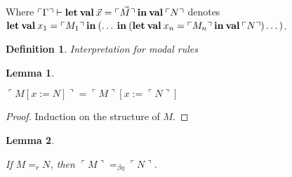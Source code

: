 \documentclass[a4paper]{article}
\newtheorem{lemma}{Lemma}
\newtheorem{defin}{Definition}
\begin{document}
Where $\ulcorner \Gamma \urcorner \vdash {\bf let \: val \:} \vec{x} = \ulcorner \vec{M} \urcorner {\: \bf in \:} {\bf val \:} \ulcorner N \urcorner$
denotes ${\bf let \: val \:} x_1 = \ulcorner M_1 \urcorner {\: \bf in \:} ( \dots {\: \bf in \:} ({\bf let \: val \:} x_n = \ulcorner M_n \urcorner {\: \bf in \:} {\bf val \:} \ulcorner N \urcorner) \dots )$.
\begin{defin} Interpretation for modal rules
  \begin{prooftree}
  \end{prooftree}

  \begin{prooftree}
  \end{prooftree}
\end{defin}


\begin{lemma}
  $ $

  $\ulcorner M [x := N] \urcorner = \ulcorner M \urcorner [x := \ulcorner N \urcorner]$
\end{lemma}

\begin{proof}
  Induction on the structure of $M$.
\end{proof}

\begin{lemma}
  $ $

  If $M =_{r} N$, then $\ulcorner M \urcorner =_{\beta \eta} \ulcorner N \urcorner$.
\end{lemma}
\end{document}
